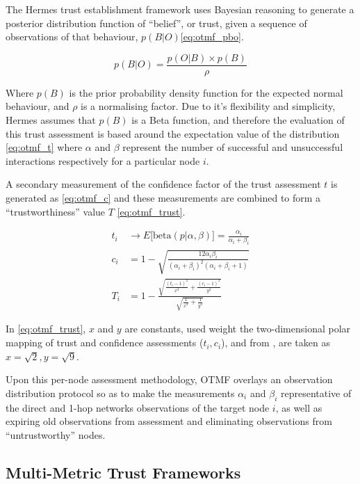 The Hermes trust establishment framework \cite{Zouridaki2005} uses Bayesian reasoning to generate a posterior distribution function of ``belief'', or trust, given a sequence of observations of that behaviour, $p(B|O)$\eqref{eq:otmf_pbo}.

\begin{equation}
p(B|O)  = \frac{p(O|B) \times p(B)}{\rho}
\label{eq:otmf_pbo}
\end{equation}

Where $p(B)$ is the prior probability density function for the expected normal behaviour, and $\rho$ is a normalising factor.
Due to it's flexibility and simplicity, Hermes assumes that $p(B)$ is a Beta function, and therefore the evaluation of this trust assessment is based around the expectation value of the distribution \eqref{eq:otmf_t}  where $\alpha$ and $\beta$ represent the number of successful and unsuccessful interactions respectively for a particular node $i$.

A secondary measurement of the confidence factor of the trust assessment $t$ is generated as \eqref{eq:otmf_c} and these measurements are combined to form a ``trustworthiness'' value $T$ \eqref{eq:otmf_trust}.

\begin{align}
t_i &\to E\lbrack\text{beta}(p|\alpha,\beta)\rbrack = \frac{\alpha_i}{\alpha_i+\beta_i} \label{eq:otmf_t}\\[5pt]
c_i &= 1 - \sqrt{\frac{12\alpha_i\beta_i}{(\alpha_i+\beta_i)^2(\alpha_i+\beta_i+1)}} \label{eq:otmf_c}\\[5pt]
T_i &= 1 - \frac{\sqrt{\frac{(t_i-1)^2}{x^2} + \frac{(c_i-1)^2}{y^2}}}{\sqrt{\frac{1}{x^2}+\frac{1}{y^2}}} \label{eq:otmf_trust}
\end{align}

In \eqref{eq:otmf_trust}, $x$ and $y$ are constants, used weight the two-dimensional polar mapping of trust and confidence assessments ($t_i,c_i$), and from \cite{Zouridaki2005}, are taken as $x=\sqrt{2},y=\sqrt{9}$.

Upon this per-node assessment methodology, OTMF overlays an observation distribution protocol so as to make the measurements $\alpha_i$ and $\beta_i$ representative of the direct and 1-hop networks observations of the target node $i$, as well as expiring old observations from assessment and eliminating observations from ``untrustworthy'' nodes.


\subsection{Multi-Metric Trust Frameworks}\label{sec:multimetrictrust}

